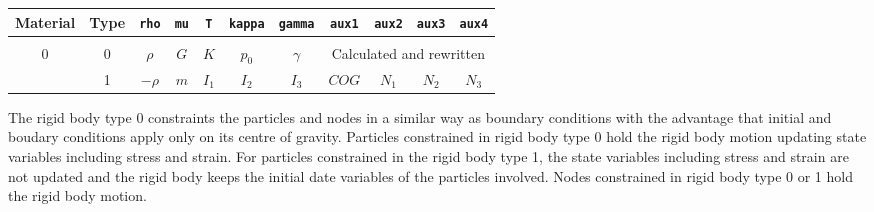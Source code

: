 
\begin{tabular}{|c|c|c|c|c|c|c|c|c|c|c|}
\hline
Material & Type & \texttt{rho} & \texttt{mu} & \texttt{T} & \texttt{kappa} & \texttt{gamma} & \texttt{aux1} & \texttt{aux2} & \texttt{aux3} & \texttt{aux4} \\ \hline
\rowcolor{mygray}\multicolumn{11}{|c|}{Rigid body}\\ \hline
\multirow{2}{*}{0} & 0 & $\rho$ & $G$ & $K$ & $p_0$ & $\gamma$ & \multicolumn{4}{c|}{Calculated and rewritten} \\ \cline{2-11}
& 1 & $-\rho$ & $m$ & $I_1$ & $I_2$ & $I_3$ & $COG$ & $N_1$ & $N_2$ & $N_3$ \\ \hline
\end{tabular}

The rigid body type 0 constraints the particles and nodes in a similar way as boundary conditions with the advantage that initial and boudary conditions apply only on its centre of gravity. Particles constrained in rigid body type 0 hold the rigid body motion updating state variables including stress and strain. For particles constrained in the rigid body type 1, the state variables including stress and strain are not updated and the rigid body keeps the initial date variables of the particles involved. Nodes constrained in rigid body type 0 or 1 hold the rigid body motion.

\newpage

